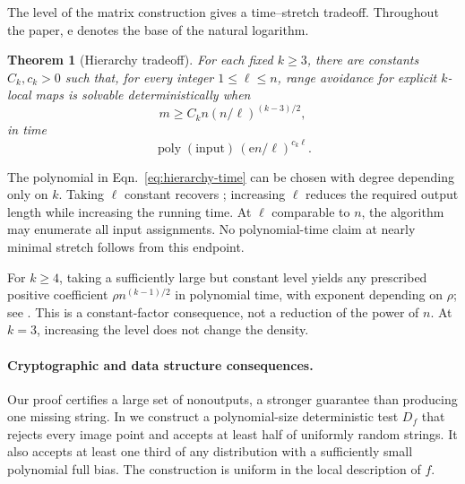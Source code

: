 \documentclass[letterpaper,11pt]{article}
\newtheorem{theorem}{Theorem}
\theoremstyle{definition}
\DeclareMathOperator{\poly}{poly}
\begin{document}
The level of the matrix construction gives a time--stretch tradeoff.
Throughout the paper, $\mathrm e$ denotes the base of the natural
logarithm.

\begin{theorem}[Hierarchy tradeoff]
\label{thm:hierarchy-avoid}
For each fixed $k\ge3$, there are constants $C_k,c_k>0$ such that,
for every integer $1\le\ell\le n$, range avoidance for explicit $k$-local
maps is solvable deterministically when
\begin{equation}
 m\ge C_k n(n/\ell)^{(k-3)/2},
 \label{eq:hierarchy-stretch}
\end{equation}
in time
\begin{equation}
 \poly(\text{input})\,(\mathrm e n/\ell)^{c_k\ell}.
 \label{eq:hierarchy-time}
\end{equation}
\end{theorem}

The polynomial in Eqn.~\eqref{eq:hierarchy-time} can be chosen with
degree depending only on $k$. Taking $\ell$ constant recovers
; increasing $\ell$ reduces the required output length
while increasing the running time. At $\ell$ comparable to $n$,
the algorithm may enumerate all input assignments. No polynomial-time
claim at nearly minimal stretch follows from this endpoint.

For $k\ge4$, taking a sufficiently large but constant level yields
any prescribed positive coefficient $\rho n^{(k-1)/2}$ in polynomial
time, with exponent depending on $\rho$; see .
This is a constant-factor consequence, not a reduction of the power
of $n$. At $k=3$, increasing the level does not change the density.

\paragraph{Cryptographic and data structure consequences.}
Our proof certifies a large set of nonoutputs, a stronger guarantee
than producing one missing string. In  we construct
a polynomial-size deterministic test $D_f$ that rejects every image
point and accepts at least half of uniformly random strings.
It also accepts at least one third of any distribution with a
sufficiently small polynomial full bias. The construction is uniform
in the local description of $f$.
\end{document}
